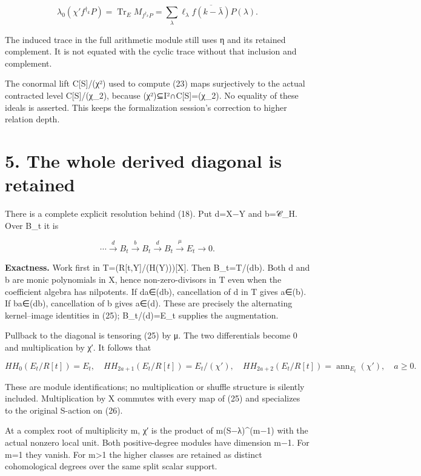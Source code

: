 \documentclass[
  11pt,
]{article}
\begin{document}
\[
\lambda_0(\chi' f^{\dagger_k}P)
 =\operatorname{Tr}_E M_{f^{\dagger_k}P}
 =\sum_\lambda\ell_\lambda\overline{f(k-\bar\lambda)}P(\lambda).
\tag{24}
\]

The induced trace in the full arithmetic module still uses η and its
retained complement. It is not equated with the cyclic trace without
that inclusion and complement.

The conormal lift C{[}S{]}/(χ²) used to compute (23) maps surjectively
to the actual contracted level C{[}S{]}/(χ\_2), because
(χ²)⊆I²∩C{[}S{]}=(χ\_2). No equality of these ideals is asserted. This
keeps the formalization session's correction to higher relation depth.

\section{5. The whole derived diagonal is
retained}\label{the-whole-derived-diagonal-is-retained}

There is a complete explicit resolution behind (18). Put d=X−Y and
b=𝒞\_H. Over B\_t it is

\[
\cdots\xrightarrow{d}B_t\xrightarrow{b}B_t
\xrightarrow{d}B_t\xrightarrow{\mu}E_t\longrightarrow0.
\tag{25}
\]

\textbf{Exactness.} Work first in T=(R{[}t,Y{]}/(H(Y))){[}X{]}. Then
B\_t=T/(db). Both d and b are monic polynomials in X, hence
non-zero-divisors in T even when the coefficient algebra has nilpotents.
If da∈(db), cancellation of d in T gives a∈(b). If ba∈(db), cancellation
of b gives a∈(d). These are precisely the alternating kernel--image
identities in (25); B\_t/(d)=E\_t supplies the augmentation.

Pullback to the diagonal is tensoring (25) by μ. The two differentials
become 0 and multiplication by χ′. It follows that

\[
HH_0(E_t/R[t])=E_t,
\quad HH_{2a+1}(E_t/R[t])=E_t/(\chi'),
\quad HH_{2a+2}(E_t/R[t])=\operatorname{ann}_{E_t}(\chi'),
\quad a\ge0.
\tag{26}
\]

These are module identifications; no multiplication or shuffle structure
is silently included. Multiplication by X commutes with every map of
(25) and specializes to the original S-action on (26).

At a complex root of multiplicity m, χ′ is the product of
m(S−λ)\^{}(m−1) with the actual nonzero local unit. Both positive-degree
modules have dimension m−1. For m=1 they vanish. For m\textgreater1 the
higher classes are retained as distinct cohomological degrees over the
same split scalar support.
\end{document}

